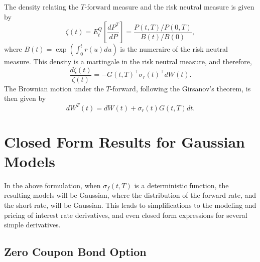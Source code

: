 \documentclass[12pt]{article}
\begin{document}
  The density relating the $T$-forward measure and the risk neutral measure is given by
  \begin{equation}
    \zeta(t)=E_t^Q\left[\frac{dP^T}{dP}\right]=\frac{P(t,T)/P(0,T)}{B(t)/B(0)},
  \end{equation}
  where $B(t)=\exp\left(\int_0^tr(u)du\right)$ is the numeraire of the risk neutral measure.
  This density is a martingale in the risk neutral measure, and therefore,
  \begin{equation}
    \frac{d\zeta(t)}{\zeta(t)}=-G(t,T)^{\top}\sigma_r(t)^{\top}dW(t).
  \end{equation}
  The Brownian motion under the $T$-forward, following the Girsanov's theorem, is then given by
  \begin{equation}
    dW^T(t)=dW(t)+\sigma_r(t)G(t,T)dt.
    \label{Tmeasure}
  \end{equation}


\section{Closed Form Results for Gaussian Models}

  In the above formulation, when $\sigma_f(t,T)$ is a deterministic function,
  the resulting models will be Gaussian, where the distribution of the forward rate, and the short rate, will be Gaussian.
  This leads to simplifications to the modeling and pricing of interest rate derivatives, and even closed form expressions
  for several simple derivatives.

  \subsection{Zero Coupon Bond Option}
\end{document}
